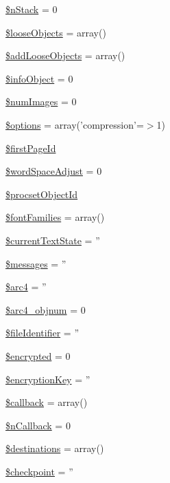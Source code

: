 \begin{DoxyCompactItemize}
\item 
\hyperlink{class_cpdf_a9de4b5d2209348f2e4479bdfbaa81c6a}{\$n\-Stack} = 0
\item 
\hyperlink{class_cpdf_aedb3e9d19ff1ebfaa5added699a9671d}{\$loose\-Objects} = array()
\item 
\hyperlink{class_cpdf_a8f094bbb6c6f5db373d4b4e3c4ed0595}{\$add\-Loose\-Objects} = array()
\item 
\hyperlink{class_cpdf_ae60fb73fb55ea5cf46351c519f2e16fd}{\$info\-Object} = 0
\item 
\hyperlink{class_cpdf_afa03e46e7e7be49ab81a9a3599af2871}{\$num\-Images} = 0
\item 
\hyperlink{class_cpdf_a011800c63ece4cbbfa77136a20607023}{\$options} = array('compression'=$>$1)
\item 
\hyperlink{class_cpdf_a6f59caca64a9cd3619591fde1bfd443f}{\$first\-Page\-Id}
\item 
\hyperlink{class_cpdf_a32de4c103af0783f44fd568d74c6454b}{\$word\-Space\-Adjust} = 0
\item 
\hyperlink{class_cpdf_a39e9c2190f8061439c35f7d2a8240318}{\$procset\-Object\-Id}
\item 
\hyperlink{class_cpdf_a3632d1cfb98c70776f2bf64fefeb1292}{\$font\-Families} = array()
\item 
\hyperlink{class_cpdf_ac7a9fec297babb986a440fa02032be15}{\$current\-Text\-State} = ''
\item 
\hyperlink{class_cpdf_a21a183f927a6d243fe6b4ba3a6c4d4c8}{\$messages} = ''
\item 
\hyperlink{class_cpdf_a8b0d646c9b1820820ea01f0db2c22339}{\$arc4} = ''
\item 
\hyperlink{class_cpdf_a7da30b74291ccb1aa4f0368140a36018}{\$arc4\-\_\-objnum} = 0
\item 
\hyperlink{class_cpdf_aaf05a37af8d9a97b51844158c9f04981}{\$file\-Identifier} = ''
\item 
\hyperlink{class_cpdf_a4ac37790931818c0ac730fa8b4e58760}{\$encrypted} = 0
\item 
\hyperlink{class_cpdf_a730bbd8ecf60f264748611532e4c6f01}{\$encryption\-Key} = ''
\item 
\hyperlink{class_cpdf_abc7c2ac0d93d22f71221e8b60512c860}{\$callback} = array()
\item 
\hyperlink{class_cpdf_a894ee84a4cce4aed0afd68456ef6685d}{\$n\-Callback} = 0
\item 
\hyperlink{class_cpdf_a122da4689a596dd289cea157977eb02c}{\$destinations} = array()
\item 
\hyperlink{class_cpdf_aeb2b7ad87c29b9898f9f05782a5de508}{\$checkpoint} = ''
\end{DoxyCompactItemize}


